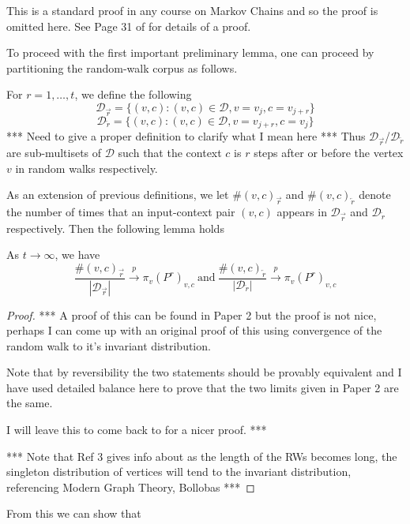 \documentclass[a4paper]{article}
\newcommand{\D}{\mathcal D}
\newcommand{\rar}{\overrightarrow r}
\newcommand{\lar}{\overleftarrow r}
\begin{document}
This is a standard proof in any course on Markov Chains and so the proof is
omitted here. See Page 31 of \cite{markov_chains} for details of a proof.

To proceed with the first important preliminary lemma, one can proceed by
partitioning the random-walk corpus as follows.

\begin{definition}
  For $r = 1, \dots, t$, we define the following
  \[\D_{\rar} = \{ (v, c) : (v, c) \in \D, v = v_j, c = v_{j+r}\}\]
  \[\D_{\lar} = \{ (v, c) : (v, c) \in \D, v = v_{j+r}, c = v_{j}\}\]
  *** Need to give a proper definition to clarify what I mean here ***
  Thus $\D_{\rar}$/$\D_{\lar}$ are sub-multisets of $\D$ such that the context
  $c$ is $r$ steps after or before the vertex $v$ in random walks respectively.
\end{definition}

As an extension of previous definitions, we let $\#(v, c)_{\rar}$ and $\#(v,
c)_{\lar}$ denote the number of times that an input-context pair $(v,c)$ appears
in $\D_{\rar}$ and $\D_{\lar}$ respectively. Then the following lemma holds
\begin{lemma}
  As $t \to \infty$, we have
  \[\frac{\#(v, c)_{\rar}}{|\D_{\rar}|} \overset{p}{\to} \pi_v(P^r)_{v,c} \  \text{and}
    \ \frac{\#(v, c)_{\lar}}{|\D_{\lar}|} \overset{p}{\to} \pi_v(P^r)_{v,c} \]
\end{lemma}
\begin{proof}
***
A proof of this can be found in Paper 2 but the proof is not nice, perhaps I can
come up with an original proof of this using convergence of the random walk to
it's invariant distribution.

Note that by reversibility the two statements should be provably equivalent and
I have used detailed balance here to prove that the two limits given in Paper 2
are the same.

I will leave this to come back to for a nicer proof.
***


*** Note that Ref 3 gives info about as the length of the RWs becomes long, the
singleton distribution of vertices will tend to the invariant distribution,
referencing Modern Graph Theory, Bollobas ***
\end{proof}

From this we can show that
\end{document}
